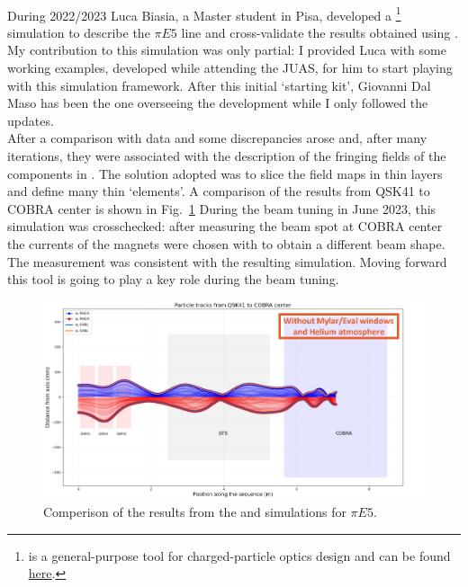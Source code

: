 \begin{refsection}
        \paragraph{\madx} During 2022/2023 Luca Biasia, a Master student in Pisa, developed a \madx\footnote{\madx is a general-purpose tool for charged-particle optics design and can be found \href{http://madx.web.cern.ch/madx/}{\underline{here}}.} simulation to describe the $\pi E5$ line and cross-validate the results obtained using \gfb. 
        My contribution to this simulation was only partial: I provided Luca with some working \madx examples, developed while attending the JUAS, for him to start playing with this simulation framework. 
        After this initial `starting kit', Giovanni Dal Maso has been the one overseeing the development while I only followed the updates. \\
        After a comparison with data and \gfb some discrepancies arose and, after many iterations, they were associated with the description of the fringing fields of the components in \madx. 
        The solution adopted was to slice the field maps in thin layers and define many thin `\madx elements'. 
        A comparison of the results from QSK41 to COBRA center is shown in Fig.~\ref{fig:madx_vs_g4b}
        During the beam tuning in June 2023, this simulation was crosschecked: after measuring the beam spot at COBRA center the currents of the magnets were chosen with \madx to obtain a different beam shape. 
        The measurement was consistent with the resulting simulation.
        Moving forward this tool is going to play a key role during the beam tuning.

        \begin{figure}
            \centering
            \includegraphics[width = \textwidth]{Figures/MEG/madx_vs_g4b.png}
            \caption{Comperison of the results from the \gfb and \madx simulations for $\pi E5$.}
            \label{fig:madx_vs_g4b}
        \end{figure}


\end{refsection}
